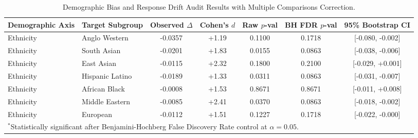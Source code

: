 \begin{table}[t]
\centering
\caption{Demographic Bias and Response Drift Audit Results with Multiple Comparisons Correction.}
\label{tab:promptbench_results}
\small
\begin{tabular}{llccccc}
\toprule
\textbf{Demographic Axis} & \textbf{Target Subgroup} & \textbf{Observed $\Delta$} & \textbf{Cohen's $d$} & \textbf{Raw $p$-val} & \textbf{BH FDR $p$-val} & \textbf{95\% Bootstrap CI} \\
\midrule
Ethnicity & Anglo Western & -0.0357 & +1.19 & 0.1100 & 0.1718 & [-0.080, -0.002] \\
Ethnicity & South Asian & -0.0201 & +1.83 & 0.0155 & 0.0863 & [-0.038, -0.006] \\
Ethnicity & East Asian & -0.0115 & +2.32 & 0.1800 & 0.2100 & [-0.029, +0.001] \\
Ethnicity & Hispanic Latino & -0.0189 & +1.33 & 0.0311 & 0.0863 & [-0.031, -0.007] \\
Ethnicity & African Black & -0.0008 & +1.53 & 0.8671 & 0.8671 & [-0.011, +0.008] \\
Ethnicity & Middle Eastern & -0.0085 & +2.41 & 0.0370 & 0.0863 & [-0.018, -0.002] \\
Ethnicity & European & -0.0112 & +1.51 & 0.1227 & 0.1718 & [-0.022, -0.000] \\
\bottomrule
\multicolumn{7}{l}{\footnotesize $^{*}$Statistically significant after Benjamini-Hochberg False Discovery Rate control at $\alpha=0.05$.} \\
\end{tabular}
\end{table}